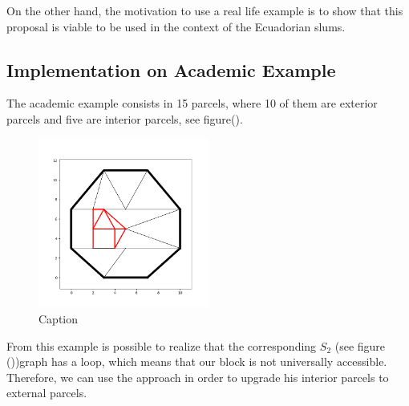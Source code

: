 \documentclass[10pt]{article}
\begin{document}
On the other hand, the motivation to use a real life example is to show that this proposal is viable to be used in the context of the Ecuadorian slums.

\subsection{Implementation on Academic Example}
The academic example consists in 15 parcels, where 10 of them are exterior parcels and five are interior parcels, see figure().\\

\begin{figure}[H]
    \centering
    \includegraphics[width=0.50\textwidth]{images/Figure_1.png}
    \caption{Caption}
    \label{fig:my_label}
\end{figure}

From this example is possible to realize that the corresponding $S_2$ (see figure ())graph has a loop, which means that our block is not universally accessible. Therefore, we can use the approach in order to upgrade his interior parcels to external parcels.\\
\end{document}
